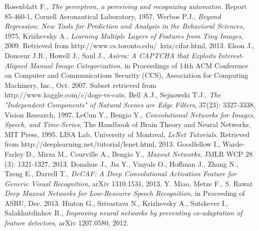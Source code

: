 \documentclass[journal]{IEEEtran}
\begin{document}
\begin{thebibliography}{1}
Rosenblatt F., \emph{The perceptron, a perceiving and recognizing automaton}. 
Report 85-460-1, Cornell Aeronautical Laboratory, 1957.
Werbos P.J., \emph{Beyond Regression: New Tools for Prediction and Analysis 
in the Behavioral Sciences}, 1975.
Krizhevsky A., \emph{Learning Multiple Layers of Features from Tiny Images},
2009. Retrieved from http://www.cs.toronto.edu/~kriz/cifar.html, 2013.
Elson J., Douceur J.R., Howell  J., Saul J., \emph{Asirra: A CAPTCHA 
that Exploits Interest-Aligned Manual Image Categorization}, in 
Proceedings of 14th ACM Conference on Computer and Communications Security 
(CCS), Association for Computing Machinery, Inc., Oct. 2007.
Subset retrieved from http://www.kaggle.com/c/dogs-vs-cats. 
Bell A.J., Sejnowski T.J., \emph{The "Independent Components" of Natural Scenes
are Edge Filters}, 37(23): 3327-3338, Vision Research, 1997.
LeCun Y., Bengio Y., \emph{Convolutional Networks for Images, Speech, 
and Time-Series}, The Handbook of Brain Theory and Neural Networks, MIT Press, 
1995.
LISA Lab, University of Montreal, \emph{LeNet Tutorials}. Retrieved from 
http://deeplearning.net/tutorial/lenet.html, 2013.
Goodfellow I., Warde-Farley D., Mirza M., Courville A., Bengio Y., 
\emph{Maxout Networks}, JMLR WCP 28 (3): 1321-1327, 2013.
Donahue J., Jia Y., Vinyals O., Hoffman J., Zhang N., Tzeng E., Darrell T., 
\emph{DeCAF: A Deep Convolutional Activation Feature for Generic 
Visual Recognition}, arXiv 1310.1531, 2013.
Y. Miao, Metze F., S. Rawat \emph{Deep Maxout Networks for Low-Resource Speech Recognition}, in 
Proceeding of ASRU, Dec. 2013.
Hinton G., Srivastava N., Krizhevsky A., Sutskever I., Salakhutdinhov R., 
\emph{Improving neural networks by preventing co-adaptation of feature
detectors}, arXiv 1207.0580, 2012.
\end{thebibliography}




\enlargethispage{-5in}
\end{document}
